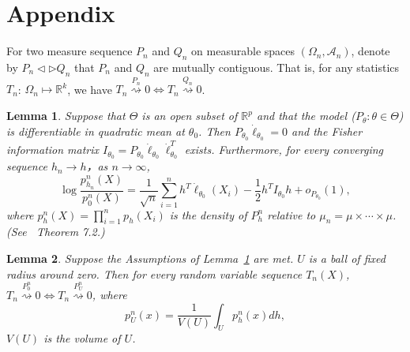 \documentclass[3p]{elsarticle}
\newtheorem{lemma}{Lemma}
\begin{document}
\section{Appendix}
For two measure sequence $P_n$ and $Q_n$ on measurable spaces $(\Omega_n,\mathcal{A}_n)$, denote by $P_n\triangleleft \triangleright Q_n$ that $P_n$ and $Q_n$ are mutually contiguous. That is, for any statistics $T_n$: $\Omega_n\mapsto \mathbb{R}^k$, we have $T_n\overset{P_n}{\rightsquigarrow}0\Leftrightarrow T_n\overset{Q_n}{\rightsquigarrow}0$.
\begin{lemma}\label{lemmaEx}
    Suppose that $\Theta$ is an open subset of $\mathbb{R}^p$ and that the model ($P_\theta: \theta \in\Theta$) is differentiable in quadratic mean at $\theta_0$. Then $P_{\theta_0}\dot{\ell}_{\theta_0}=0$ and the Fisher information matrix $I_{\theta_0}=P_{\theta_0}\dot{\ell}_{\theta_0}\dot{\ell}_{\theta_0}^T$ exists. Furthermore, for every converging sequence $h_n\to h$，as $n\to \infty$,
    \begin{equation}
        \log \frac{p^n_{h_n}(X)}{p^n_0(X)}=\frac{1}{\sqrt{n}}\sum^n_{i=1}h^T\dot{\ell}_{\theta_0}(X_i)-\frac{1}{2}h^T I_{\theta_0}h+o_{P_{\theta_0}}(1),
    \end{equation}
    where $p_h^n(X)=\prod_{i=1}^n p_h(X_i)$ is the density of $P_h^n$ relative to $\mu_n=\mu\times \cdots \times \mu$.
    (See~\cite{van2000asymptotic} Theorem 7.2.)
\end{lemma}



\begin{lemma}\label{lemmaContiguity}
    Suppose the Assumptions of Lemma~\ref{lemmaEx} are met. $U$ is a ball of fixed radius around zero. Then for every random variable sequence $T_n(X)$, $T_n\overset{P^n_0}{\rightsquigarrow}0\Leftrightarrow T_n\overset{P^n_U}{\rightsquigarrow}0$, where
\begin{equation}
    p^n_U(x)=\frac{1}{V(U)}\int_{U}p_h^n(x)dh,
\end{equation}
$V(U)$ is the volume of $U$.
\end{lemma}
\end{document}
